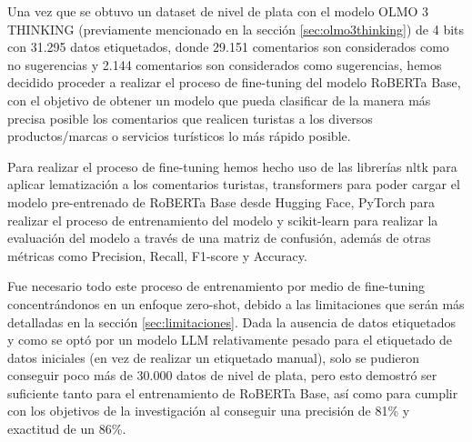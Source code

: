Una vez que se obtuvo un dataset de nivel de plata con el modelo OLMO 3 THINKING (previamente mencionado en la sección \ref{sec:olmo3thinking}) de 4 bits con 31.295 datos etiquetados, donde 29.151 comentarios son considerados como no sugerencias y 2.144 comentarios son considerados como sugerencias, hemos decidido proceder a realizar el proceso de fine-tuning del modelo RoBERTa Base, con el objetivo de obtener un modelo que pueda clasificar de la manera más precisa posible los comentarios que realicen turistas a los diversos productos/marcas o servicios turísticos lo más rápido posible.

Para realizar el proceso de fine-tuning hemos hecho uso de las librerías nltk para aplicar lematización a los comentarios turistas, transformers para poder cargar el modelo pre-entrenado de RoBERTa Base desde Hugging Face, PyTorch para realizar el proceso de entrenamiento del modelo y scikit-learn para realizar la evaluación del modelo a través de una matriz de confusión, además de otras métricas como Precision, Recall, F1-score y Accuracy.

Fue necesario todo este proceso de entrenamiento por medio de fine-tuning concentrándonos en un enfoque zero-shot, debido a las limitaciones que serán más detalladas en la sección \ref{sec:limitaciones}. Dada la ausencia de datos etiquetados y como se optó por un modelo LLM relativamente pesado para el etiquetado de datos iniciales (en vez de realizar un etiquetado manual), solo se pudieron conseguir poco más de 30.000 datos de nivel de plata, pero esto demostró ser suficiente tanto para el entrenamiento de RoBERTa Base, así como para cumplir con los objetivos de la investigación al conseguir una precisión de 81\% y exactitud de un 86\%.

